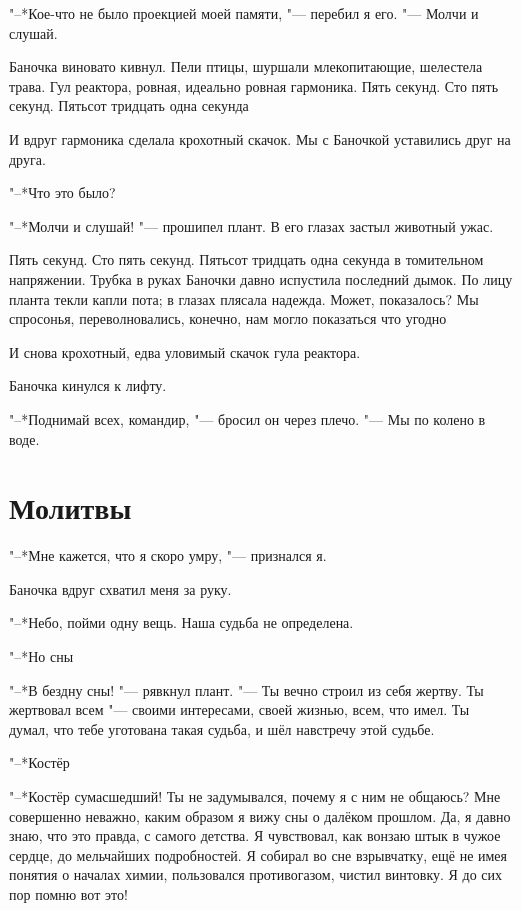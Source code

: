 \documentclass[a4paper,10pt]{book}
\newcommand{\ldotst}{\so{...}\xspace}
\begin{document}
"--*Кое-что не было проекцией моей памяти, "--- перебил я его. "--- Молчи и 
слушай.

Баночка виновато кивнул. Пели птицы, шуршали млекопитающие, шелестела трава. 
Гул реактора, 
ровная, идеально ровная гармоника. Пять секунд. Сто пять секунд. Пятьсот 
тридцать одна секунда\ldotst

И вдруг гармоника сделала крохотный скачок. Мы с Баночкой уставились 
друг на друга.

"--*Что это было?

"--*Молчи и слушай! "--- прошипел плант. В его глазах застыл животный ужас.

Пять секунд. Сто пять секунд. Пятьсот тридцать одна секунда в томительном 
напряжении. Трубка в руках Баночки давно испустила последний дымок. По лицу 
планта текли капли пота;
в глазах плясала надежда. Может, показалось? Мы спросонья, 
переволновались, конечно, нам могло показаться что угодно\ldotst

И снова крохотный, едва уловимый скачок гула реактора.

Баночка кинулся к лифту.

"--*Поднимай всех, командир, "--- бросил он через плечо. "--- Мы по колено в 
воде.

\section{Молитвы}

"--*Мне кажется, что я скоро умру, "--- признался я.

Баночка вдруг схватил меня за руку.

"--*Небо, пойми одну вещь. Наша судьба не определена.

"--*Но сны\ldotst

"--*В бездну сны! "--- рявкнул плант. "--- Ты вечно строил из себя жертву.
Ты жертвовал всем "--- своими интересами, своей жизнью, всем, что имел.
Ты думал, что тебе уготована такая судьба, и шёл навстречу этой судьбе.

"--*Костёр\ldotst

"--*Костёр сумасшедший! Ты не задумывался, почему я с ним не общаюсь? 
Мне совершенно неважно, каким образом я вижу сны о далёком прошлом.
Да, я давно знаю, что это правда, с самого детства. Я чувствовал, как вонзаю штык в чужое сердце, до мельчайших подробностей. Я собирал во сне взрывчатку, ещё не имея понятия о началах химии, пользовался противогазом, чистил винтовку. Я до сих пор помню вот это!
\end{document}

